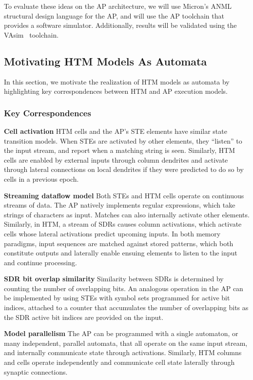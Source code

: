 To evaluate these ideas on the AP architecture, we will use Micron's ANML structural design language for the AP, and will use the AP toolchain that provides a software simulator.
Additionally, results will be validated using the VAsim~\cite{wadden2016vasim} toolchain.

\subsection{Motivating HTM Models As Automata}

In this section, we motivate the realization of HTM models as automata by highlighting key correspondences between HTM and AP execution models.

\subsubsection{Key Correspondences}

\textbf{Cell activation}
HTM cells and the AP's STE elements have similar state transition models.
When STEs are activated by other elements, they ``listen'' to the input stream, and report when a matching string is seen.
Similarly, HTM cells are enabled by external inputs through column dendrites and activate through lateral connections on local dendrites if they were predicted to do so by cells in a previous epoch.

\textbf{Streaming dataflow model}
Both STEs and HTM cells operate on continuous streams of data.
The AP natively implements regular expressions, which take strings of characters as input.
Matches can also internally activate other elements.
Similarly, in HTM, a stream of SDRs causes column activations, which activate cells whose lateral activations predict upcoming inputs.
In both memory paradigms, input sequences are matched against stored patterns, which both constitute outputs and laterally enable ensuing elements to listen to the input and continue processing.

\textbf{SDR bit overlap similarity}
Similarity between SDRs is determined by counting the number of overlapping bits.
An analogous operation in the AP can be implemented by using STEs with symbol sets programmed for active bit indices, attached to a counter that accumulates the number of overlapping bits as the SDR active bit indices are provided on the input.

\textbf{Model parallelism}
The AP can be programmed with a single automaton, or many independent, parallel automata, that all operate on the same input stream, and internally communicate state through activations.
Similarly, HTM columns and cells operate independently and communicate cell state laterally through synaptic connections.

